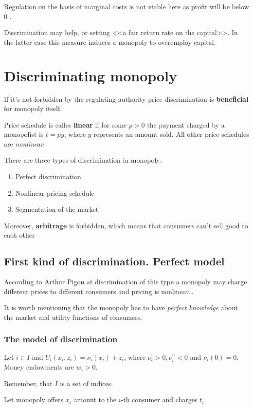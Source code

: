 \documentclass[a4paper, 10pt]{article}
\begin{document}
Regulation on the basis of marginal costs is not viable here as profit will be below 0 .

Discrimination may help, or setting <<a fair return rate on the capital>>. In the latter case this measure induces a monopoly to overemploy capital.


\section{Discriminating monopoly}
If it's not forbidden by the regulating authority price discrimination is \textbf{beneficial} for monopoly itself.

 Price schedule is calles \textbf{linear} if for some $p>0$ the payment charged by a monopolist is $t=py$, where $y$ represents an amount sold. All other price schedules are \textit{nonlinear}

There are three types of discrimination in monopoly:
\begin{enumerate}
    \item Perfect discrimination
    \item Nonlinear pricing schedule
    \item Segmentation of the market
\end{enumerate}

Moreover, \textbf{arbitrage} is forbidden, which means that consumers can't sell good to each other


\subsection{First kind of discrimination. Perfect model}
According to Arthur Pigou at discrimination of this type a monopoly may charge different prices to different consumers and pricing is nonlinear\dots

It is worth mentioning that the monopoly has to have \textit{perfect knowledge} about the market and utility functions of consumers.


\subsubsection{The model of discrimination}
Let $i \in I$ and $U_i\left(x_i, z_i\right)=\nu_i\left(x_i\right)+z_i$, where $\nu_i^{\prime}>0, \nu_i^{\prime \prime}<0$ and $\nu_i(0)=0$. Money endowments are $w_i>0$.

Remember, that $I$ is a set of indices.

Let monopoly offers $x_i$ amount to the $i$-th consumer and charges $t_i$. 
\end{document}
